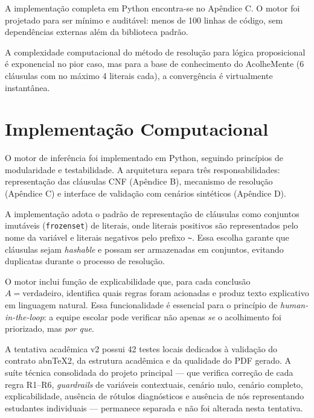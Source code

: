 \documentclass[
    12pt,
    openright,
    oneside,
    a4paper,
    english,
    brazil
]{abntex2}
\begin{document}
A implementação completa em Python encontra-se no Apêndice C. O motor foi projetado para ser mínimo e auditável: menos de 100 linhas de código, sem dependências externas além da biblioteca padrão.

A complexidade computacional do método de resolução para lógica proposicional é exponencial no pior caso, mas para a base de conhecimento do AcolheMente (6 cláusulas com no máximo 4 literais cada), a convergência é virtualmente instantânea.

\chapter{Implementação Computacional}

O motor de inferência foi implementado em Python, seguindo princípios de modularidade e testabilidade. A arquitetura separa três responsabilidades: representação das cláusulas CNF (Apêndice B), mecanismo de resolução (Apêndice C) e interface de validação com cenários sintéticos (Apêndice D).

A implementação adota o padrão de representação de cláusulas como conjuntos imutáveis (\texttt{frozenset}) de literais, onde literais positivos são representados pelo nome da variável e literais negativos pelo prefixo \texttt{\textasciitilde}. Essa escolha garante que cláusulas sejam \textit{hashable} e possam ser armazenadas em conjuntos, evitando duplicatas durante o processo de resolução.

O motor inclui função de explicabilidade que, para cada conclusão $A = \text{verdadeiro}$, identifica quais regras foram acionadas e produz texto explicativo em linguagem natural. Essa funcionalidade é essencial para o princípio de \textit{human-in-the-loop}: a equipe escolar pode verificar não apenas \textit{se} o acolhimento foi priorizado, mas \textit{por que}.

A tentativa acadêmica v2 possui 42 testes locais dedicados à validação do contrato abnTeX2, da estrutura acadêmica e da qualidade do PDF gerado. A suíte técnica consolidada do projeto principal --- que verifica correção de cada regra R1--R6, \textit{guardrails} de variáveis contextuais, cenário nulo, cenário completo, explicabilidade, ausência de rótulos diagnósticos e ausência de nós representando estudantes individuais --- permanece separada e não foi alterada nesta tentativa.
\end{document}
